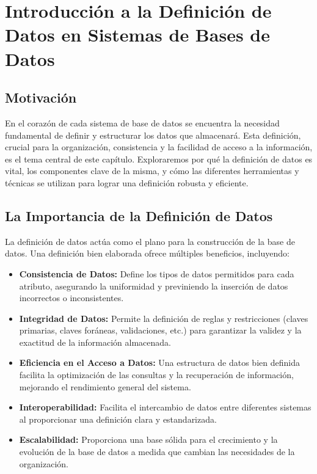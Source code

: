 \chapter{Introducción a la Definición de Datos en Sistemas de Bases de Datos}

\section{Motivación}

En el corazón de cada sistema de base de datos se encuentra la necesidad fundamental de definir y estructurar los datos que almacenará.  Esta definición, crucial para la organización, consistencia y la facilidad de acceso a la información, es el tema central de este capítulo. Exploraremos por qué la definición de datos es vital, los componentes clave de la misma, y cómo las diferentes herramientas y técnicas se utilizan para lograr una definición robusta y eficiente.

\section{La Importancia de la Definición de Datos}

La definición de datos actúa como el plano para la construcción de la base de datos.  Una definición bien elaborada ofrece múltiples beneficios, incluyendo:

\begin{itemize}
    \item \textbf{Consistencia de Datos:} Define los tipos de datos permitidos para cada atributo, asegurando la uniformidad y previniendo la inserción de datos incorrectos o inconsistentes.
    \item \textbf{Integridad de Datos:} Permite la definición de reglas y restricciones (claves primarias, claves foráneas, validaciones, etc.) para garantizar la validez y la exactitud de la información almacenada.
    \item \textbf{Eficiencia en el Acceso a Datos:} Una estructura de datos bien definida facilita la optimización de las consultas y la recuperación de información, mejorando el rendimiento general del sistema.
    \item \textbf{Interoperabilidad:} Facilita el intercambio de datos entre diferentes sistemas al proporcionar una definición clara y estandarizada.
    \item \textbf{Escalabilidad:} Proporciona una base sólida para el crecimiento y la evolución de la base de datos a medida que cambian las necesidades de la organización.
\end{itemize}

